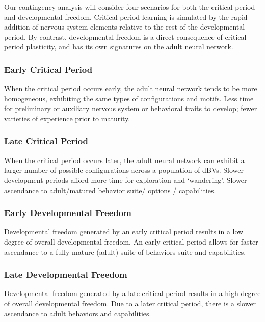 \documentclass{article}
\begin{document}
Our contingency analysis will consider four scenarios for both the critical period and developmental freedom. Critical period learning is simulated by the rapid addition of nervous system elements relative to the rest of the developmental period. By contrast, developmental freedom is a direct consequence of critical period plasticity, and has its own signatures on the adult neural network.

\subsubsection{Early Critical Period}

When the critical period occurs early, the adult neural network tends to be more homogeneous, exhibiting the same types of configurations and motifs. Less time for preliminary or auxiliary nervous system or behavioral traits to develop; fewer varieties of experience prior to maturity.  

\subsubsection{Late Critical Period}

When the critical period occurs later, the adult neural network can exhibit a larger number of possible configurations across a population of dBVs. Slower development periods afford more time for exploration and ‘wandering’. Slower ascendance to adult/matured behavior suite/ options / capabilities. 

\subsubsection{Early Developmental Freedom}

Developmental freedom generated by an early critical period results in a low degree of overall developmental freedom. An early critical period allows for faster ascendance to a fully mature (adult) suite of behaviors suite and capabilities. 

\subsubsection{Late Developmental Freedom}

Developmental freedom generated by a late critical period results in a high degree of overall developmental freedom. Due to a later critical period, there is a slower ascendance to adult behaviors and capabilities. 
\end{document}
